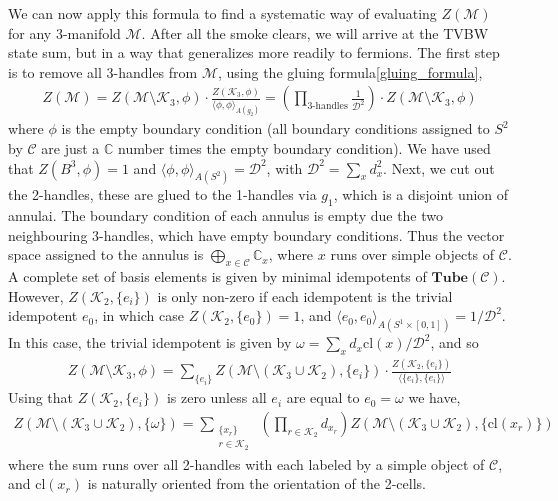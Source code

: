 \documentclass[12pt,a4paper]{article}
\newcommand{\cc}{\mathbb{C}}
\newcommand{\mcd}{\mathcal{D}}
\newcommand{\mcc}{\mathcal{C}}
\newcommand{\mck}{\mathcal{K}}
\newcommand{\mcm}{\mathcal{M}}
\newcommand{\tube}{\textbf{Tube}}
\begin{document}
We can now apply this formula to find a systematic way of evaluating $Z(\mcm)$ for any 3-manifold $\mcm$.
After all the smoke clears, we will arrive at the TVBW state sum, 
but in a way that generalizes more readily to fermions.
The first step is to remove all 3-handles from $\mcm$, using the gluing formula\eqref{gluing_formula}, 
\begin{align}
Z(\mcm) = Z(\mcm \setminus \mck_3, \phi) \cdot \frac{Z(\mck_3, \phi)}{\langle \phi,\phi \rangle_{A(g_2)} }= \left(\prod_{\text{3-handles}} \frac{1}{\mcd^2} \right) \cdot Z(\mcm \setminus \mck_3, \phi)
\end{align}
where $\phi$ is the empty boundary condition (all boundary conditions assigned to $S^2$ by $\mcc$ are just a $\cc$ number times the empty boundary condition).
We have used that $Z(B^3, \phi) = 1$ and $\langle \phi , \phi \rangle_{A(S^2)} = \mcd^2$, with $\mcd^2 = \sum_x d_x^2$.
Next, we cut out the 2-handles, these are glued to the 1-handles via $g_1$, which is a disjoint union of annulai. 
The boundary condition of each annulus is empty due the two neighbouring 3-handles, which have empty boundary conditions.
Thus the vector space assigned to the annulus is $\bigoplus_{x\in \mcc} \cc_x$, 
where $x$ runs over simple objects of $\mcc$. 
A complete set of basis elements is given by minimal idempotents of $\tube(\mcc)$. 
However, $Z(\mck_2,\{ e_{i} \})$ is only non-zero if each idempotent is the trivial idempotent $e_0$, 
in which case $Z(\mck_2, \{e_0 \}) = 1$, 
and $\langle e_0, e_0 \rangle_{A(S^1 \times [0,1])} =1/\mcd^2$.
In this case, the trivial idempotent is given by $\omega = \sum_x d_x \text{cl}(x)/\mcd^2$, 
and so
\begin{align}
Z(\mcm \setminus \mck_3, \phi) = \sum_{\{ e_i \}} Z(\mcm \setminus (\mck_3 \cup \mck_2),\{ e_{i} \}) \cdot \frac{Z(\mck_2, \{ e_i \})}{\langle \{ e_i\}, \{e_i\} \rangle} %
\end{align}
Using that $Z(\mck_2, \{ e_i \})$ is zero unless all $e_i$ are equal to $e_0 = \omega$ we have, 
\begin{align}
Z(\mcm \setminus(\mck_3 \cup \mck_2),\{ \omega \}) = \sum_{\substack{\{x_{r} \} \\ r \in \mck_2}}\;  \left( \prod_{r \in \mck_2} d_{x_r}  \right) Z(\mcm \setminus(\mck_3 \cup \mck_2),\{ \text{cl}(x_{r}) \} )
\end{align}
where the sum runs over all 2-handles with each labeled by a simple object of $\mcc$, and $\text{cl}(x_r)$ is naturally oriented from the orientation of the 2-cells.
\end{document}
